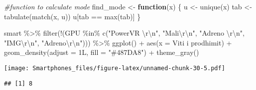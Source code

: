 \documentclass[
]{article}
\newenvironment{Shaded}{\begin{snugshade}}{\end{snugshade}}
\newcommand{\AttributeTok}[1]{\textcolor[rgb]{0.77,0.63,0.00}{#1}}
\newcommand{\CommentTok}[1]{\textcolor[rgb]{0.56,0.35,0.01}{\textit{#1}}}
\newcommand{\ControlFlowTok}[1]{\textcolor[rgb]{0.13,0.29,0.53}{\textbf{#1}}}
\newcommand{\FunctionTok}[1]{\textcolor[rgb]{0.00,0.00,0.00}{#1}}
\newcommand{\NormalTok}[1]{#1}
\newcommand{\OtherTok}[1]{\textcolor[rgb]{0.56,0.35,0.01}{#1}}
\newcommand{\SpecialCharTok}[1]{\textcolor[rgb]{0.00,0.00,0.00}{#1}}
\newcommand{\StringTok}[1]{\textcolor[rgb]{0.31,0.60,0.02}{#1}}
\begin{document}
\begin{Shaded}
\begin{Highlighting}[]
\CommentTok{\#function to calculate mode}
\NormalTok{find\_mode }\OtherTok{\textless{}{-}} \ControlFlowTok{function}\NormalTok{(x) \{}
\NormalTok{  u }\OtherTok{\textless{}{-}} \FunctionTok{unique}\NormalTok{(x)}
\NormalTok{  tab }\OtherTok{\textless{}{-}} \FunctionTok{tabulate}\NormalTok{(}\FunctionTok{match}\NormalTok{(x, u))}
\NormalTok{  u[tab }\SpecialCharTok{==} \FunctionTok{max}\NormalTok{(tab)]}
\NormalTok{\}}

\NormalTok{smart }\SpecialCharTok{\%\textgreater{}\%}
 \FunctionTok{filter}\NormalTok{(}\SpecialCharTok{!}\NormalTok{(GPU }\SpecialCharTok{\%in\%} \FunctionTok{c}\NormalTok{(}\StringTok{"PowerVR }\SpecialCharTok{\textbackslash{}r\textbackslash{}n}\StringTok{"}\NormalTok{, }\StringTok{"Mali}\SpecialCharTok{\textbackslash{}r\textbackslash{}n}\StringTok{"}\NormalTok{, }\StringTok{"Adreno }\SpecialCharTok{\textbackslash{}r\textbackslash{}n}\StringTok{"}\NormalTok{, }\StringTok{"IMG}\SpecialCharTok{\textbackslash{}r\textbackslash{}n}\StringTok{"}\NormalTok{, }\StringTok{"Adreno}\SpecialCharTok{\textbackslash{}r\textbackslash{}n}\StringTok{"}\NormalTok{))) }\SpecialCharTok{\%\textgreater{}\%}
 \FunctionTok{ggplot}\NormalTok{() }\SpecialCharTok{+}
  \FunctionTok{aes}\NormalTok{(}\AttributeTok{x =} \StringTok{\textasciigrave{}}\AttributeTok{Viti i prodhimit}\StringTok{\textasciigrave{}}\NormalTok{) }\SpecialCharTok{+}
  \FunctionTok{geom\_density}\NormalTok{(}\AttributeTok{adjust =}\NormalTok{ 1L, }\AttributeTok{fill =} \StringTok{"\#487DA8"}\NormalTok{) }\SpecialCharTok{+}
  \FunctionTok{theme\_gray}\NormalTok{()}
\end{Highlighting}
\end{Shaded}

\texttt{[image: Smartphones\_files/figure-latex/unnamed-chunk-30-5.pdf]}

\begin{Shaded}
\end{Shaded}

\begin{verbatim}
## [1] 8
\end{verbatim}
\end{document}
